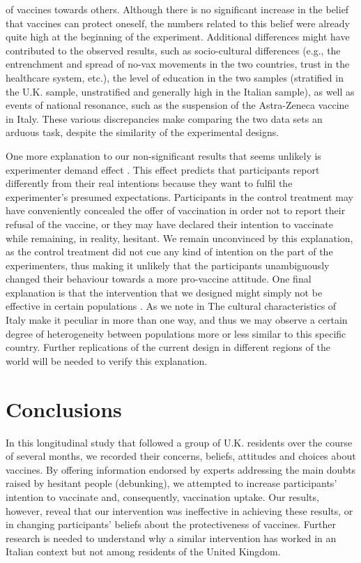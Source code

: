 \documentclass[authordate, empirical]{jote-new-article}
\begin{document}
of vaccines towards others. Although there is no significant increase in the belief that vaccines can protect oneself, the numbers related to this belief were already quite high at the beginning of the experiment. Additional differences might have contributed to the observed results, such as socio-cultural differences (e.g., the entrenchment and spread of no-vax movements in the two countries, trust in the healthcare system, etc.), the level of education in the two samples (stratified in the U.K. sample, unstratified and generally high in the Italian sample), as well as events of national resonance, such as the suspension of the Astra-Zeneca vaccine in Italy. These various discrepancies make comparing the two data sets an arduous task, despite the similarity of the experimental designs.



One more explanation to our non-significant results that seems unlikely is experimenter demand effect \parencites{Zizzo2009}. This effect predicts that participants report differently from their real intentions because they want to fulfil the experimenter's presumed expectations. Participants in the control treatment may have conveniently concealed the offer of vaccination in order not to report their refusal of the vaccine, or they may have declared their intention to vaccinate while remaining, in reality, hesitant. We remain unconvinced by this explanation, as the control treatment did not cue any kind of intention on the part of the experimenters, thus making it unlikely that the participants unambiguously changed their behaviour towards a more pro-vaccine attitude. One final explanation is that the intervention that we designed might simply not be effective in certain populations \parencites{Bryan2021}. As we note in \textcite{Ronzani2022} The cultural characteristics of Italy make it peculiar in more than one way, and thus we may observe a certain degree of heterogeneity between populations more or less similar to this specific country. Further replications of the current design in different regions of the world will be needed to verify this explanation.




\section{Conclusions}



In this longitudinal study that followed a group of U.K. residents over the course of several months, we recorded their concerns, beliefs, attitudes and choices about vaccines. By offering information endorsed by experts addressing the main doubts raised by hesitant people (debunking), we attempted to increase participants' intention to vaccinate and, consequently, vaccination uptake. Our results, however, reveal that our intervention was ineffective in achieving these results, or in changing participants' beliefs about the protectiveness of vaccines. Further research is needed to understand why a similar intervention has worked in an Italian context but not among residents of the United Kingdom.
\end{document}
